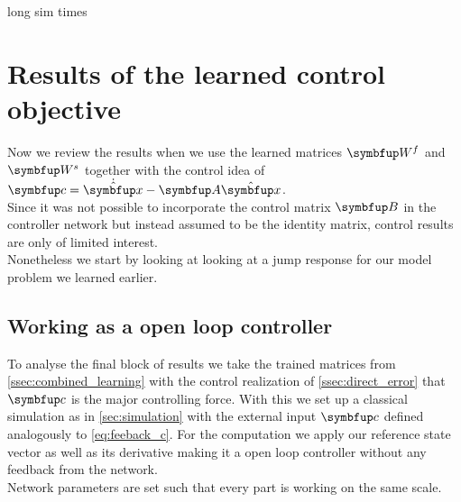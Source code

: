 long sim times

\section{Results of the learned control objective}\label{sec:res_total}
Now we review the results when we use the learned matrices $\bmu{W}^f$ and $\bmu{W}^s$ together with the control idea of $\bmu{c} = \dot{\hat{\bmu{x}}} - \bmu{A}\hat{\bmu{x}}$.\\
Since it was not possible to incorporate the control matrix $\bmu{B}$ in the controller network but instead assumed to be the identity matrix, control results are only of limited interest.\\
Nonetheless we start by looking at looking at a jump response for our model problem we learned earlier.
\subsection{Working as a open loop controller}
To analyse the final block of results we take the trained matrices from \cref{ssec:combined_learning} with the control realization of \cref{ssec:direct_error} that $\bmu{c}$ is the major controlling force. With this we set up a classical simulation as in \cref{sec:simulation} with the external input $\bmu{c}$ defined analogously to \cref{eq:feeback_c}. For the computation we apply our reference state vector as well as its derivative making it a open loop controller without any feedback from the network.\\
Network parameters are set such that every part is working on the same scale.\\
